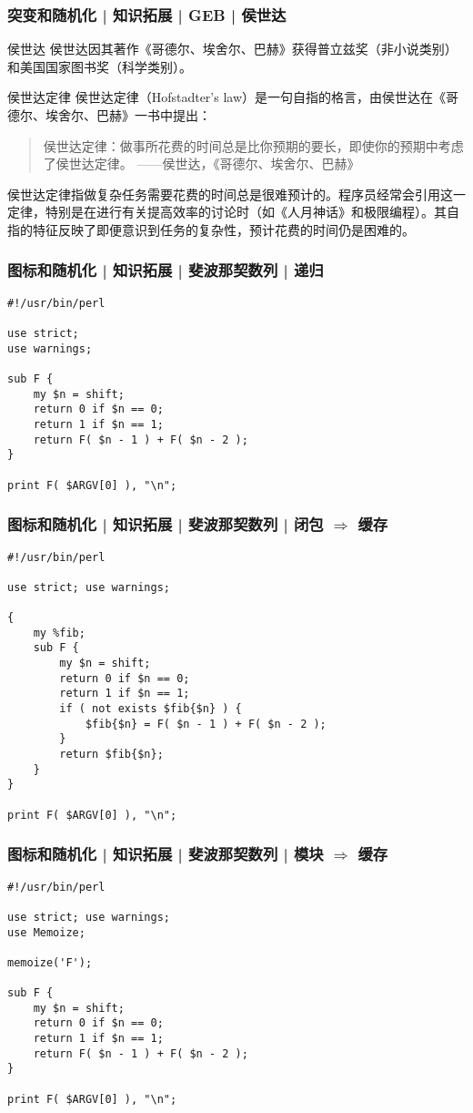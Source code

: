 \begin{frame}
  \frametitle{突变和随机化 | 知识拓展 | GEB | 侯世达}
  \begin{block}{侯世达}
    侯世达因其著作《哥德尔、埃舍尔、巴赫》获得普立兹奖（非小说类别）和美国国家图书奖（科学类别）。
  \end{block}
  \begin{block}{\alert{侯世达定律}}
    侯世达定律（Hofstadter's law）是一句自指的格言，由侯世达在《哥德尔、埃舍尔、巴赫》一书中提出：
    \begin{quote}
    侯世达定律：做事所花费的时间总是比你预期的要长，即使你的预期中考虑了侯世达定律。 ——侯世达，《哥德尔、埃舍尔、巴赫》
    \end{quote}
侯世达定律指做复杂任务需要花费的时间总是很难预计的。程序员经常会引用这一定律，特别是在进行有关提高效率的讨论时（如《人月神话》和极限编程）。其自指的特征反映了即便意识到任务的复杂性，预计花费的时间仍是困难的。
  \end{block}
\end{frame}

\begin{frame}[fragile]
  \frametitle{图标和随机化 | 知识拓展 | 斐波那契数列 | 递归}
\begin{lstlisting}
#!/usr/bin/perl

use strict;
use warnings;

sub F {
    my $n = shift;
    return 0 if $n == 0;
    return 1 if $n == 1;
    return F( $n - 1 ) + F( $n - 2 );
}

print F( $ARGV[0] ), "\n";
\end{lstlisting}
\end{frame}

\begin{frame}[fragile]
  \frametitle{图标和随机化 | 知识拓展 | 斐波那契数列 | \alert{闭包 $\Rightarrow$ 缓存}}
\begin{lstlisting}[basicstyle=\small\tt]
#!/usr/bin/perl

use strict; use warnings;

{
    my %fib;
    sub F {
        my $n = shift;
        return 0 if $n == 0;
        return 1 if $n == 1;
        if ( not exists $fib{$n} ) {
            $fib{$n} = F( $n - 1 ) + F( $n - 2 );
        }
        return $fib{$n};
    }
}

print F( $ARGV[0] ), "\n";
\end{lstlisting}
\end{frame}

\begin{frame}[fragile]
  \frametitle{图标和随机化 | 知识拓展 | 斐波那契数列 | 模块 $\Rightarrow$ 缓存}
\begin{lstlisting}
#!/usr/bin/perl

use strict; use warnings;
use Memoize;

memoize('F');

sub F {
    my $n = shift;
    return 0 if $n == 0;
    return 1 if $n == 1;
    return F( $n - 1 ) + F( $n - 2 );
}

print F( $ARGV[0] ), "\n";
\end{lstlisting}
\end{frame}

